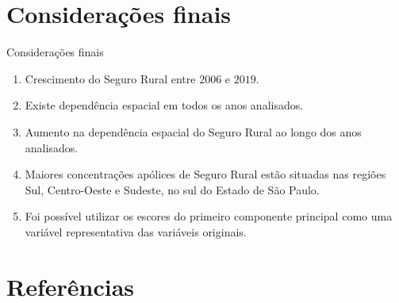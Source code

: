 \documentclass[aspectratio=169]{beamer}
\begin{document}
\section{Considerações finais}

\begin{frame}{Considerações finais}
		\begin{enumerate}
	    \item Crescimento do Seguro Rural entre $2006$ e $2019$.
	    \vspace{0.25cm}
		\item Existe dependência espacial em todos os anos analisados.
		\vspace{0.25cm}
		\item Aumento na dependência espacial do Seguro Rural ao longo dos anos analisados.
		\vspace{0.25cm}
		\item Maiores concentrações apólices de Seguro Rural estão situadas nas regiões Sul, Centro-Oeste e Sudeste, no sul do Estado de São Paulo.
		\vspace{0.25cm}
		\item Foi possível utilizar os escores do primeiro componente principal como uma variável representativa das variáveis originais.
	\end{enumerate}
\end{frame}

\section{Referências}
\end{document}
